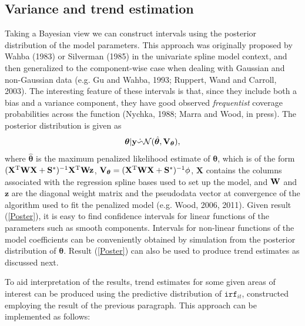 \subsection{Variance and trend estimation \label{VE}}

Taking a Bayesian view we can construct intervals using the posterior distribution of the model parameters. This approach was originally proposed by Wahba (1983) or Silverman (1985) in the univariate spline model context, and then generalized to the component-wise case when dealing with Gaussian and non-Gaussian data (e.g. Gu and Wahba, 1993; Ruppert, Wand and Carroll, 2003). The interesting feature of these intervals is that, since they include both a bias and a variance component, they have good observed \textit{frequentist} coverage probabilities across the function (Nychka, 1988; Marra and Wood, in press). The posterior distribution is given as
\begin{equation}
\bm\theta|{\bf y} \dot{\backsim} \mathcal{N}( \hat{\bm\theta}, {\bf V}_{\bm\theta} ),
\label{Poster}
\end{equation}
where $\hat{\bm\theta}$ is the maximum penalized likelihood estimate of $\bm\theta$, which is of the form $(\mathbf{X}^\text{T}{\bf W}\mathbf{X}+{\bf S}^*)^{-1}\mathbf{X}^\text{T}{\bf W}{\bf z}$, ${\bf V}_{\bm\theta} = (\mathbf{X}^\text{T}{\bf W}\mathbf{X}+{\bf S}^*)^{-1}\phi$, $\mathbf{X}$ contains the columns associated with the regression spline bases used to set up the model, and ${\bf W}$ and $\mathbf{z}$ are the diagonal weight matrix and the pseudodata vector at convergence of the algorithm used to fit the penalized model (e.g. Wood, 2006, 2011). Given result (\ref{Poster}), it is easy to find confidence intervals for linear functions of the parameters such as smooth components. Intervals for non-linear functions of the model coefficients can be conveniently obtained by simulation from the posterior distribution of $\bm\theta$. Result (\ref{Poster}) can also be used to produce trend estimates as discussed next.

To aid interpretation of the results, trend estimates for some given areas of interest can be produced using the predictive distribution of $\texttt{irf}_{it}$, constructed employing the result of the previous paragraph. This approach can be implemented as follows:

